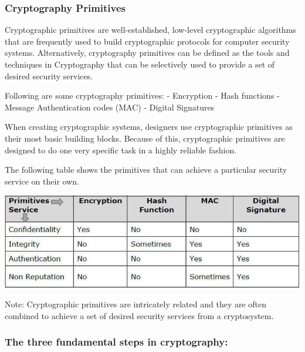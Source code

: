 \documentclass[11pt]{article}
\makeatletter
\def\maxwidth{\ifdim\Gin@nat@width>\linewidth\linewidth
    \else\Gin@nat@width\fi}
\let\Oldincludegraphics\includegraphics
\renewcommand{\includegraphics}[1]{\Oldincludegraphics[width=.8\maxwidth]{#1}}
\makeatother
\begin{document}
\hypertarget{cryptography-primitives}{%
\subsubsection{Cryptography Primitives}\label{cryptography-primitives}}

Cryptographic primitives are well-established, low-level cryptographic
algorithms that are frequently used to build cryptographic protocols for
computer security systems. Alternatively, cryptography primitives can be
defined as the tools and techniques in Cryptography that can be
selectively used to provide a set of desired security services.

Following are some cryptography primitives: - Encryption - Hash
functions - Message Authentication codes (MAC) - Digital Signatures

When creating cryptographic systems, designers use cryptographic
primitives as their most basic building blocks. Because of this,
cryptographic primitives are designed to do one very specific task in a
highly reliable fashion.

The following table shows the primitives that can achieve a particular
security service on their own.

\includegraphics{./Images/CryptoPrimitives.png}

Note: Cryptographic primitives are intricately related and they are
often combined to achieve a set of desired security services from a
cryptosystem.

\hypertarget{the-three-fundamental-steps-in-cryptography}{%
\subsubsection{The three fundamental steps in
cryptography:}\label{the-three-fundamental-steps-in-cryptography}}
\end{document}
